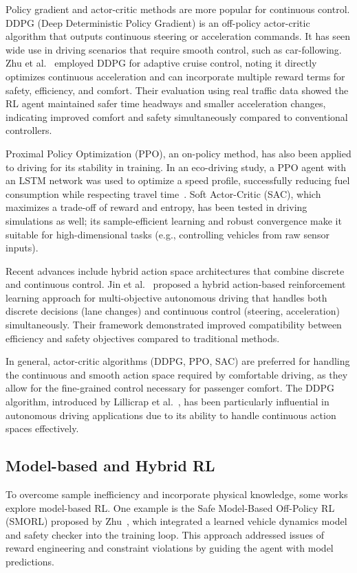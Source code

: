 \documentclass[12pt,a4paper]{article}
\begin{document}
Policy gradient and actor-critic methods are more popular for continuous control. DDPG (Deep Deterministic Policy Gradient) is an off-policy actor-critic algorithm that outputs continuous steering or acceleration commands. It has seen wide use in driving scenarios that require smooth control, such as car-following. Zhu et al.~\cite{zhu2020} employed DDPG for adaptive cruise control, noting it directly optimizes continuous acceleration and can incorporate multiple reward terms for safety, efficiency, and comfort. Their evaluation using real traffic data showed the RL agent maintained safer time headways and smaller acceleration changes, indicating improved comfort and safety simultaneously compared to conventional controllers.

Proximal Policy Optimization (PPO), an on-policy method, has also been applied to driving for its stability in training. In an eco-driving study, a PPO agent with an LSTM network was used to optimize a speed profile, successfully reducing fuel consumption while respecting travel time~\cite{zhu2021}. Soft Actor-Critic (SAC), which maximizes a trade-off of reward and entropy, has been tested in driving simulations as well; its sample-efficient learning and robust convergence make it suitable for high-dimensional tasks (e.g., controlling vehicles from raw sensor inputs).

Recent advances include hybrid action space architectures that combine discrete and continuous control. Jin et al.~\cite{jin2025} proposed a hybrid action-based reinforcement learning approach for multi-objective autonomous driving that handles both discrete decisions (lane changes) and continuous control (steering, acceleration) simultaneously. Their framework demonstrated improved compatibility between efficiency and safety objectives compared to traditional methods.

In general, actor-critic algorithms (DDPG, PPO, SAC) are preferred for handling the continuous and smooth action space required by comfortable driving, as they allow for the fine-grained control necessary for passenger comfort. The DDPG algorithm, introduced by Lillicrap et al.~\cite{lillicrap2016}, has been particularly influential in autonomous driving applications due to its ability to handle continuous action spaces effectively.

\subsection{Model-based and Hybrid RL}
To overcome sample inefficiency and incorporate physical knowledge, some works explore model-based RL. One example is the Safe Model-Based Off-Policy RL (SMORL) proposed by Zhu~\cite{zhu2021}, which integrated a learned vehicle dynamics model and safety checker into the training loop. This approach addressed issues of reward engineering and constraint violations by guiding the agent with model predictions.
\end{document}
